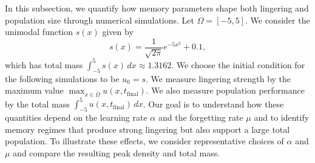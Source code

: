 \documentclass{article}
\begin{document}
In this subsection, we quantify how memory parameters shape both lingering and population size through numerical simulations. 
Let $\Omega=[-5,5]$. 
We consider the unimodal function $s(x)$ given by
\[
s(x) = \frac{1}{\sqrt{2\pi}}e^{-5x^2}+0.1,
\]
which has total mass $\int_{-5}^5 s(x)\,dx \approx 1.3162$. 
We choose the initial condition for the following simulations to be $u_0=s$.
We measure lingering strength by the maximum value $\max_{x\in\overline\Omega} u(x,t_{\mathrm{final}})$. 
We also measure population performance by the total mass $\int_{-5}^{5} u(x,t_{\mathrm{final}})\,dx$. 
Our goal is to understand how these quantities depend on the learning rate $\alpha$ and the forgetting rate $\mu$ and to identify memory regimes that produce strong lingering but also support a large total population. 
To illustrate these effects, we consider representative choices of $\alpha$ and $\mu$ and compare the resulting peak density and total mass. 
\end{document}
